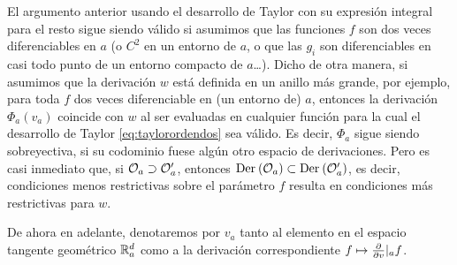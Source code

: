 \begin{obsSobreDerivaciones}\label{obs:sobrederivaciones}
	El argumento anterior usando el desarrollo de Taylor con su
	expresi\'{o}n integral para el resto sigue siendo v\'{a}lido
	si asumimos que las funciones $f$ son dos veces diferenciables
	en $a$ (o $C^{2}$ en un entorno de $a$, o que las $g_{i}$ son
	diferenciables en casi todo punto de un entorno compacto de $a$\dots).
	Dicho de otra manera, si asumimos que la derivaci\'{o}n $w$ est\'{a}
	definida en un anillo m\'{a}s grande, por ejemplo, para toda $f$ dos
	veces diferenciable en (un entorno de) $a$, entonces la
	derivaci\'{o}n $\Phi_{a}(v_{a})$ coincide con $w$ al ser evaluadas
	en cualquier funci\'{o}n para la cual el desarrollo de Taylor
	\eqref{eq:taylorordendos} sea v\'{a}lido. Es decir, $\Phi_{a}$ sigue
	siendo sobreyectiva, si su codominio fuese alg\'{u}n otro espacio de
	derivaciones. Pero es casi inmediato que, si $\cal{O}_{a}\supset%
	\cal{O}'_{a}$, entonces $\derivaciones{\cal{O}_{a}}\subset%
	\derivaciones{\cal{O}'_{a}}$, es decir, condiciones menos
	restrictivas sobre el par\'{a}metro $f$ resulta en condiciones
	m\'{a}s restrictivas para $w$.
\end{obsSobreDerivaciones}

De ahora en adelante, denotaremos por $v_{a}$ tanto al elemento en el espacio
tangente geom\'{e}trico $\mathbb{R}^{d}_{a}$ como a la derivaci\'{o}n
correspondiente $f\mapsto\gancho{v}|_{a}f$.

